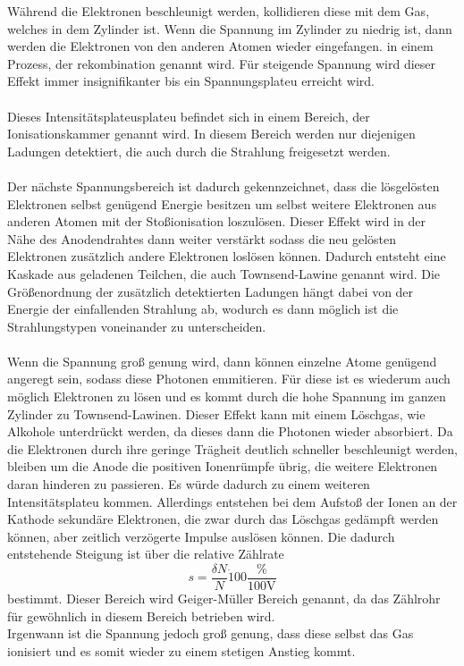 \noindent Während die Elektronen beschleunigt werden, kollidieren diese mit dem Gas, welches in dem  Zylinder ist.
Wenn die Spannung im Zylinder zu niedrig ist, dann werden die Elektronen von den anderen Atomen wieder eingefangen.
in einem Prozess, der rekombination genannt wird. Für steigende Spannung wird dieser Effekt immer insignifikanter bis
ein Spannungsplateu erreicht wird. \\
\\
\noindent Dieses Intensitätsplateusplateu befindet sich in einem Bereich, der Ionisationskammer genannt wird. In diesem Bereich
werden nur diejenigen Ladungen detektiert, die auch durch die Strahlung freigesetzt werden.\\
\\
\noindent Der nächste Spannungsbereich ist dadurch gekennzeichnet, dass die lösgelösten Elektronen selbst genügend Energie
besitzen um selbst weitere Elektronen aus anderen Atomen mit der Stoßionisation loszulösen. Dieser Effekt wird in der 
Nähe des Anodendrahtes dann weiter verstärkt sodass die neu gelösten Elektronen zusätzlich andere Elektronen loslösen
können. Dadurch entsteht eine Kaskade aus geladenen Teilchen, die auch Townsend-Lawine genannt wird. Die Größenordnung
der zusätzlich detektierten Ladungen hängt dabei von der Energie der einfallenden Strahlung ab, wodurch es dann möglich
ist die Strahlungstypen voneinander zu unterscheiden.\\
\\
\noindent Wenn die Spannung groß genung wird, dann können einzelne Atome genügend angeregt sein, sodass diese Photonen
emmitieren. Für diese ist es wiederum auch möglich Elektronen zu lösen und es kommt durch die hohe Spannung im ganzen
Zylinder zu Townsend-Lawinen. Dieser Effekt kann mit einem Löschgas, wie Alkohole unterdrückt werden, da dieses dann die
Photonen wieder absorbiert.  Da die Elektronen durch ihre geringe Trägheit deutlich schneller beschleunigt werden,
bleiben um die Anode die positiven Ionenrümpfe übrig, die weitere Elektronen daran hinderen zu passieren. Es würde dadurch 
zu einem weiteren Intensitätsplateu kommen. Allerdings entstehen bei dem Aufstoß der Ionen an der Kathode sekundäre
Elektronen, die zwar durch das Löschgas gedämpft werden können, aber zeitlich verzögerte Impulse auslösen können.
Die dadurch entstehende Steigung ist über die relative Zählrate
\begin{equation}
    s=\frac{\delta N}{N} \dot 100\frac{\unit{\percent}}{100\unit{\volt}}
    \label{eqn:relativ}
\end{equation}
bestimmt. Dieser Bereich wird Geiger-Müller Bereich genannt, da das Zählrohr für gewöhnlich in diesem Bereich betrieben wird.\\
\noindent Irgenwann ist die Spannung jedoch groß genung, dass diese selbst das Gas ionisiert und es somit wieder zu einem 
stetigen Anstieg kommt.

